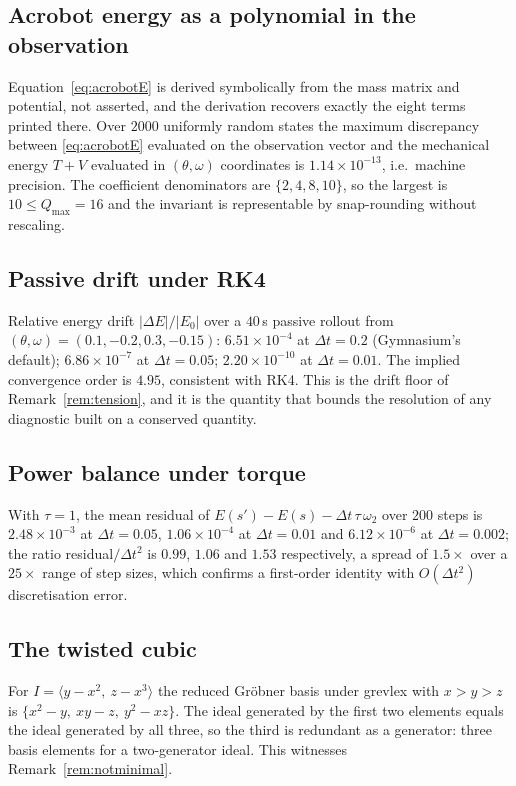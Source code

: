 \documentclass{article}
\begin{document}
\subsection{Acrobot energy as a polynomial in the observation}
\label{app:acrobot}
Equation~\eqref{eq:acrobotE} is derived symbolically from the mass matrix and
potential, not asserted, and the derivation recovers exactly the eight
terms printed there. Over $2000$ uniformly random states the maximum discrepancy
between \eqref{eq:acrobotE} evaluated on the observation vector and the
mechanical energy $T + V$ evaluated in $(\theta,\omega)$ coordinates is
$1.14\times10^{-13}$, i.e.\ machine precision. The coefficient denominators are
$\{2,4,8,10\}$, so the largest is $10 \le Q_{\max} = 16$ and the invariant is
representable by snap-rounding without rescaling.

\subsection{Passive drift under RK4}
\label{app:drift}
Relative energy drift $|\Delta E| / |E_0|$ over a $40\,$s passive rollout from
$(\theta,\omega) = (0.1, -0.2, 0.3, -0.15)$: $6.51\times10^{-4}$ at
$\Delta t = 0.2$
(Gymnasium's default); $6.86\times10^{-7}$ at $\Delta t = 0.05$;
$2.20\times10^{-10}$ at $\Delta t = 0.01$. The implied convergence order is
$4.95$, consistent with RK4. This is the drift floor of
Remark~\ref{rem:tension}, and it is the quantity that bounds the resolution of
any diagnostic built on a conserved quantity.

\subsection{Power balance under torque}
\label{app:balance}
With $\tau = 1$, the mean residual of
$E(s') - E(s) - \Delta t\,\tau\,\omega_2$ over $200$ steps is
$2.48\times10^{-3}$ at $\Delta t = 0.05$, $1.06\times10^{-4}$ at
$\Delta t = 0.01$ and $6.12\times10^{-6}$ at $\Delta t = 0.002$; the ratio
residual$/\Delta t^2$ is $0.99$, $1.06$ and $1.53$ respectively, a spread of
$1.5\times$ over a $25\times$ range of step sizes, which confirms a first-order
identity with $O(\Delta t^2)$ discretisation error.

\subsection{The twisted cubic}
\label{app:tc}
For $I = \langle y - x^2,\ z - x^3\rangle$ the reduced Gr\"obner basis under
grevlex with $x > y > z$ is $\{x^2 - y,\ xy - z,\ y^2 - xz\}$. The ideal
generated by the first two elements equals the ideal generated by all three, so
the third is redundant as a generator: three basis elements for a two-generator
ideal. This witnesses Remark~\ref{rem:notminimal}.
\end{document}
